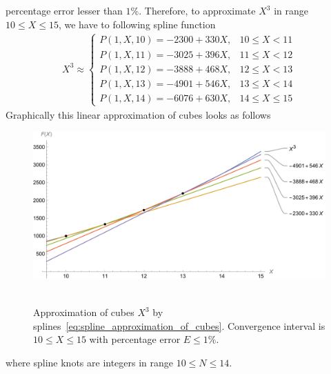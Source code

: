 percentage error lesser than $1\%$.
Therefore, to approximate $X^3$ in range $10 \leq X \leq 15$, we have to following spline function
\begin{align}
    X^3 \approx
    \begin{cases}
        P(1,X,10) = -2300 + 330X, & 10 \leq X < 11 \\
        P(1,X,11) = -3025 + 396X, & 11 \leq X < 12 \\
        P(1,X,12) = -3888 + 468X, & 12 \leq X < 13 \\
        P(1,X,13) = -4901 + 546X, & 13 \leq X < 14 \\
        P(1,X,14) = -6076 + 630X, & 14 \leq X \leq 15
    \end{cases}
    \label{eq:spline_approximation_of_cubes}
\end{align}
Graphically this linear approximation of cubes looks as follows
\begin{figure}[H]
    \centering
    \includegraphics[width=1\textwidth]{sections/images/08_plots_of_cubes_power_with_p_2_10_15}
    ~\caption{
        Approximation of cubes $X^3$ by splines~\eqref{eq:spline_approximation_of_cubes}.
        Convergence interval is $10 \leq X \leq 15$ with percentage error $E\leq 1\%$.
    }
    \label{fig:08_plots_of_cubes_power_with_p_2_10_15}
\end{figure}
where spline knots are integers in range $10 \leq N \leq 14$.


